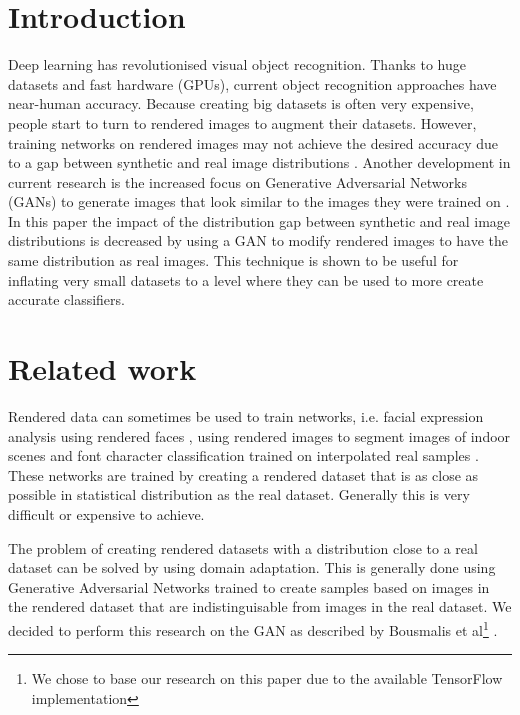 \documentclass[10pt,twocolumn,letterpaper]{article}
\begin{document}
\section{Introduction}

Deep learning has revolutionised visual object recognition. Thanks to huge datasets and fast hardware (GPUs), current object recognition approaches have near-human accuracy.
Because creating big datasets is often very expensive, people start to turn to rendered images to augment their datasets. However, training networks on rendered images may not achieve the desired accuracy due to a gap between synthetic and real image distributions \cite{10.1.1.151.7688}.
Another development in current research is the increased focus on Generative Adversarial Networks (GANs) to generate images that look similar to the images they were trained on \cite{1406.2661}.
In this paper the impact of the distribution gap between synthetic and real image distributions is decreased by using a GAN to modify rendered images to have the same distribution as real images. This technique is shown to be useful for inflating very small datasets to a level where they can be used to more create accurate classifiers.

\section{Related work}
Rendered data can sometimes be used to train networks, i.e. facial expression analysis using rendered faces \cite{Abbasnejad_2017_ICCV}, using rendered images to segment images of indoor scenes \cite{10.1.1.94.777} and font character classification trained on interpolated real samples \cite{10.1.1.151.7688}. These networks are trained by creating a rendered dataset that is as close as possible in statistical distribution as the real dataset. Generally this is very difficult or expensive to achieve.

The problem of creating rendered datasets with a distribution close to a real dataset can be solved by using domain adaptation. This is generally done using Generative Adversarial Networks \cite{10.1109/CVPR.2017.18, 10.1007/978-3-319-58347-1, 1703.05192.pdf} trained to create samples based on images in the rendered dataset that are indistinguisable from images in the real dataset. We decided to perform this research on the GAN as described by Bousmalis et al\footnote{We chose to base our research on this paper due to the available TensorFlow\cite{tensorflow} implementation} \cite{10.1109/CVPR.2017.18}.
\end{document}
